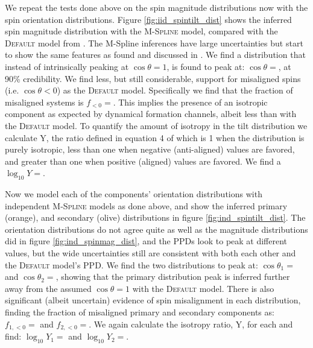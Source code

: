 We repeat the tests done above on the spin magnitude distributions now with the spin orientation distributions. Figure \ref{fig:iid_spintilt_dist} 
shows the inferred spin magnitude distribution with the \textsc{M-Spline} model, compared with the \textsc{Default} model from \citet{o3b_astro_dist}. 
The M-Spline inferences have large uncertainties but start to show the same features as found and discussed in \citet{spinitasyoulike}. 
We find a distribution that instead of intrinsically peaking at $\cos{\theta}=1$, is found to peak at: $\cos{\theta}=$\result{$\CIPlusMinus{\macros[MSplineIIDCompSpins][peakCosTilt]}$}, at 
90\% credibility. We find less, but still considerable, support for misaligned spins (i.e. $\cos{\theta}<0$) as the \textsc{Default} model. Specifically we 
find that the fraction of misaligned systems is $f_{<0}=$\result{$\CIPlusMinus{\macros[MSplineIIDCompSpins][negFrac]}$}. This implies 
the presence of an isotropic component as expected by dynamical formation channels, albeit less than with the \textsc{Default} model. To quantify the 
amount of isotropy in the tilt distribution we calculate Y, the ratio defined in equation 4 of \citet{spinitasyoulike} which is 1 when the distribution is 
purely isotropic, less than one when negative (anti-aligned) values are favored, and greater than one when positive (aligned) values are favored.
We find a $\log_{10}Y=$. 

Now we model each of the components' orientation distributions with independent \textsc{M-Spline} models as done above, and show the inferred 
primary (orange), and secondary (olive) distributions in figure \ref{fig:ind_spintilt_dist}. The orientation distributions do not agree quite as well as 
the magnitude distributions did in figure \ref{fig:ind_spinmag_dist}, and the PPDs look to peak at different values, but the wide uncertainties still are 
consistent with both each other and the \textsc{Default} model's PPD. We find the two distributions to peak at: $\cos{\theta_1}=$\result{$\CIPlusMinus{\macros[MSplineIndependentCompSpins][peakCosTilt1]}$} 
and $\cos{\theta_2}=$\result{$\CIPlusMinus{\macros[MSplineIndependentCompSpins][peakCosTilt2]}$}, showing that the primary distribution peak is inferred further away 
from the assumed $\cos{\theta}=1$ with the \textsc{Default} model. There is also significant (albeit uncertain) evidence of spin misalignment in each distribution, finding 
the fraction of misaligned primary and secondary components as: $f_{1,<0}=$\result{$\CIPlusMinus{\macros[MSplineIndependentCompSpins][negFrac1]}$} and $f_{2,<0}=$\result{$\CIPlusMinus{\macros[MSplineIndependentCompSpins][negFrac2]}$}.
We again calculate the isotropy ratio, Y, for each and find: $\log_{10}Y_1=$ and 
$\log_{10}Y_2=$.

